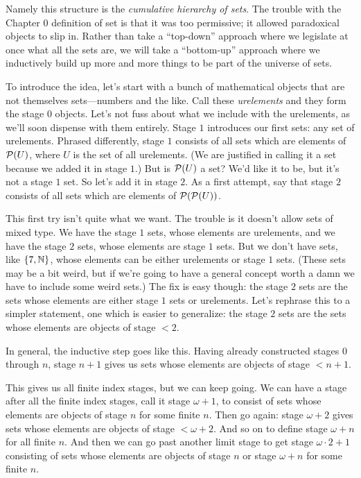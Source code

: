 \documentclass[10pt]{amsart}
\begin{document}
Namely this structure is the \emph{cumulative hierarchy of sets}. The trouble with the Chapter 0 definition of set is that it was too permissive; it allowed paradoxical objects to slip in. Rather than take a ``top-down'' approach where we legislate at once what all the sets are, we will take a ``bottom-up'' approach where we inductively build up more and more things to be part of the universe of sets. 

To introduce the idea, let's start with a bunch of mathematical objects that are not themselves sets---numbers and the like. Call these \emph{urelements} and they form the stage $0$ objects. Let's not fuss about what we include with the urelements, as we'll soon dispense with them entirely. Stage $1$ introduces our first sets: any set of urelements. Phrased differently, stage $1$ consists of all sets which are elements of $\mathcal{P}(U)$, where $U$ is the set of all urelements. (We are justified in calling it a set because we added it in stage $1$.) But is $\mathcal{P}(U)$ a set? We'd like it to be, but it's not a stage $1$ set. So let's add it in stage $2$. As a first attempt, say that stage $2$ consists of all sets which are elements of $\mathcal{P}(\mathcal{P}(U))$.

This first try isn't quite what we want. The trouble is it doesn't allow sets of mixed type. We have the stage $1$ sets, whose elements are urelements, and we have the stage $2$ sets, whose elements are stage $1$ sets. But we don't have sets, like $\{7,\mathbb{N}\}$, whose elements can be either urelements or stage $1$ sets. (These sets may be a bit weird, but if we're going to have a general concept worth a damn we have to include some weird sets.) The fix is easy though: the stage $2$ sets are the sets whose elements are either stage $1$ sets or urelements. Let's rephrase this to a simpler statement, one which is easier to generalize: the stage $2$ sets are the sets whose elements are objects of stage $<2$.

In general, the inductive step goes like this. Having already constructed stages $0$ through $n$, stage $n+1$ gives us sets whose elements are objects of stage $<n+1$.

This gives us all finite index stages, but we can keep going. We can have a stage after all the finite index stages, call it stage $\omega + 1$, to consist of sets whose elements are objects of stage $n$ for some finite $n$. Then go again: stage $\omega+2$ gives sets whose elements are objects of stage $<\omega+2$. And so on to define stage $\omega+n$ for all finite $n$. And then we can go past another limit stage to get stage $\omega \cdot 2 + 1$ consisting of sets whose elements are objects of stage $n$ or stage $\omega+n$ for some finite $n$.
\end{document}
